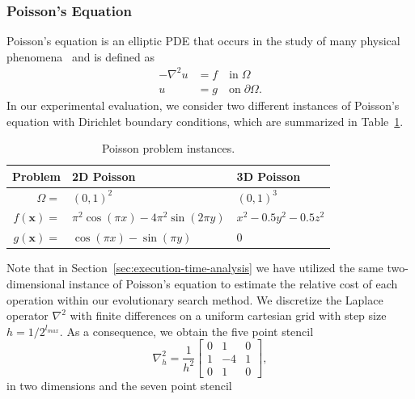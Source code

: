 \subsubsection{Poisson's Equation}
\label{sec:poisson-equation}
Poisson's equation is an elliptic PDE that occurs in the study of many physical phenomena~\cite{folland2020introduction} and is defined as
\begin{equation}
	\begin{split}
		-\nabla^{2} u & = f \quad \text{in} \; \Omega \\
		u & = g \quad \text{on} \; \partial \Omega.
	\end{split}
	\label{eq:poisson}
\end{equation}
In our experimental evaluation, we consider two different instances of Poisson's equation with Dirichlet boundary conditions, which are summarized in Table~\ref{table:poisson-problems}.
\begin{table}
	\begin{tabular}{r l l}
		\toprule
		Problem & 2D Poisson & 3D Poisson \\
		\midrule
		$\Omega = $ & $ (0, 1)^2$ & $(0, 1)^3$ \\
		\midrule
		$f(\bm{x}) = $ & $\pi^2 \cos(\pi x) - 4 \pi^2 \sin(2 \pi y)$ & $x^2 - 0.5 y^2 - 0.5 z^2$ \\
		\midrule
		$g(\bm{x}) = $ & $\cos(\pi x) - \sin(\pi y)$ & $0$ \\
		\bottomrule
	\end{tabular}
	\caption{Poisson problem instances.}
	\label{table:poisson-problems}
\end{table}
Note that in Section~\ref{sec:execution-time-analysis} we have utilized the same two-dimensional instance of Poisson's equation to estimate the relative cost of each operation within our evolutionary search method.
We discretize the Laplace operator $\nabla^{2}$ with finite differences on a uniform cartesian grid with step size $h = 1/2^{l_{max}}$.
As a consequence, we obtain the five point stencil
\begin{equation*}
	\nabla^2_h = 
	\frac{1}{h^2} \begin{bmatrix}
		0 & 1 & 0\\
		1 & -4 & 1 \\
		0 & 1 & 0  
	\end{bmatrix},
\end{equation*}
in two dimensions and the seven point stencil
